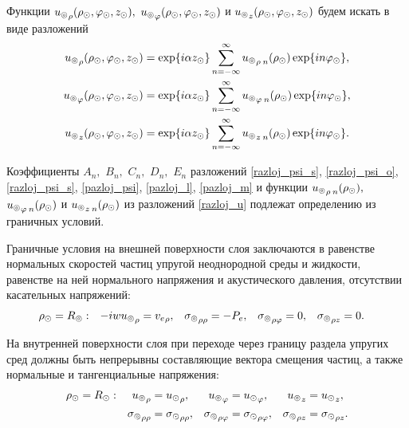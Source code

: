 \newpage
Функции ${u_\circledcirc}_{\rho}(\rho_\odot, \varphi_\odot, z_\odot),$ ${u_\circledcirc}_{\varphi}(\rho_\odot, \varphi_\odot, z_\odot)$ и ${u_\circledcirc}_{z}(\rho_\odot, \varphi_\odot, z_\odot)$ будем искать в виде разложений
\begin{equation}\label{razloj_u}
\begin{aligned}
{u_\circledcirc}_{\rho}(\rho_\odot, \varphi_\odot, z_\odot)&=\exp\{i\alpha z_\odot\}\sum_{n=-\infty}^{\infty}{u_\circledcirc}_{\rho\:n}(\rho_\odot)\exp\{in\varphi_\odot\},\\
{u_\circledcirc}_{\varphi}(\rho_\odot, \varphi_\odot, z_\odot)&=\exp\{i\alpha z_\odot\}\sum_{n=-\infty}^{\infty}{u_\circledcirc}_{\varphi\:n}(\rho_\odot)\exp\{in\varphi_\odot\},\\
{u_\circledcirc}_{z}(\rho_\odot, \varphi_\odot, z_\odot)&=\exp\{i\alpha z_\odot\}\sum_{n=-\infty}^{\infty}{u_\circledcirc}_{z\:n}(\rho_\odot)\exp\{in\varphi_\odot\}.
\end{aligned}
\end{equation}

Коэффициенты $A_n,$ $B_n,$ $C_n,$ $D_n,$ $E_n$ разложений \eqref{razloj_psi_s}, \eqref{razloj_psi_o}, \eqref{razloj_psi_s}, \eqref{pazloj_psi}, \eqref{pazloj_l}, \eqref{pazloj_m} и функции ${u_\circledcirc}_{\rho\:n}(\rho_\odot),$ ${u_\circledcirc}_{\varphi\:n}(\rho_\odot)$ и ${u_\circledcirc}_{z\:n}(\rho_\odot)$ из разложений \eqref{razloj_u} подлежат определению из граничных условий.

Граничные условия на внешней поверхности слоя заключаются в равенстве нормальных скоростей частиц упругой неоднородной среды и жидкости, равенстве на ней нормального напряжения и акустического давления, отсутствии касательных напряжений:
\begin{equation}\label{vneshnaja_pover_sloja}
\begin{aligned}
\rho_\odot &=R_\circledcirc: &-iw{u_\circledcirc}_{\rho}&={v_e}_{\rho}, &{\sigma_\circledcirc}_{\rho\rho}&=-P_e, &{\sigma_\circledcirc}_{\rho\varphi}&=0, &{\sigma_\circledcirc}_{\rho z}&=0.
\end{aligned}
\end{equation}

На внутренней поверхности слоя при переходе через границу раздела упругих сред должны быть непрерывны составляющие вектора смещения частиц, а также нормальные и тангенциальные напряжения:
\begin{equation}\label{vnutr_pover_sloja}
\begin{aligned}
\rho_\odot&=R_\odot: &{u_\circledcirc}_{\rho}&={u_\odot}_{\rho}, &{u_\circledcirc}_{\varphi}&={u_\odot}_{\varphi}, &{u_\circledcirc}_{z}&={u_\odot}_{z},\\
& &{\sigma_\circledcirc}_{\rho\rho}&={\sigma_\odot}_{\rho\rho}, &{\sigma_\circledcirc}_{\rho\varphi}&={\sigma_\odot}_{\rho\varphi},  &{\sigma_\circledcirc}_{\rho z}&={\sigma_\odot}_{\rho z}.
\end{aligned}
\end{equation}

